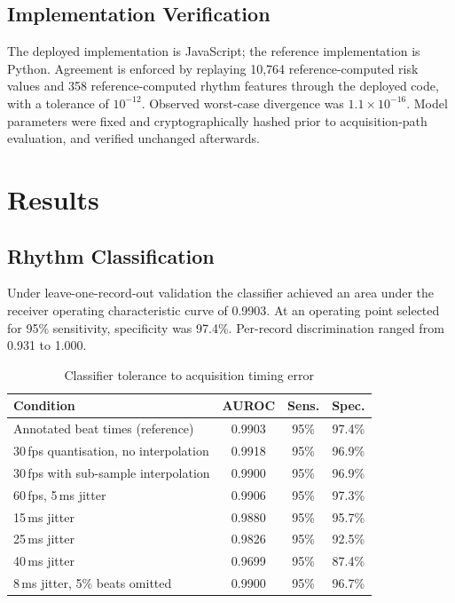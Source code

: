 \documentclass[conference]{IEEEtran}
\begin{document}
\subsection{Implementation Verification}
The deployed implementation is JavaScript; the reference implementation is Python.
Agreement is enforced by replaying 10{,}764 reference-computed risk values and 358
reference-computed rhythm features through the deployed code, with a tolerance of
$10^{-12}$. Observed worst-case divergence was $1.1 \times 10^{-16}$. Model
parameters were fixed and cryptographically hashed prior to acquisition-path
evaluation, and verified unchanged afterwards.

\section{Results}
\label{sec:results}

\subsection{Rhythm Classification}
Under leave-one-record-out validation the classifier achieved an area under the
receiver operating characteristic curve of 0.9903. At an operating point selected
for 95\% sensitivity, specificity was 97.4\%. Per-record discrimination ranged from
0.931 to 1.000.

\begin{table}[t]
\caption{Classifier tolerance to acquisition timing error}
\label{tab:noise}
\centering
\footnotesize
\begin{tabular}{lccc}
\toprule
Condition & AUROC & Sens. & Spec. \\
\midrule
Annotated beat times (reference)      & 0.9903 & 95\% & 97.4\% \\
30\,fps quantisation, no interpolation & 0.9918 & 95\% & 96.9\% \\
30\,fps with sub-sample interpolation  & 0.9900 & 95\% & 96.9\% \\
60\,fps, 5\,ms jitter                  & 0.9906 & 95\% & 97.3\% \\
15\,ms jitter                          & 0.9880 & 95\% & 95.7\% \\
25\,ms jitter                          & 0.9826 & 95\% & 92.5\% \\
40\,ms jitter                          & 0.9699 & 95\% & 87.4\% \\
8\,ms jitter, 5\% beats omitted        & 0.9900 & 95\% & 96.7\% \\
\bottomrule
\end{tabular}
\end{table}
\end{document}

